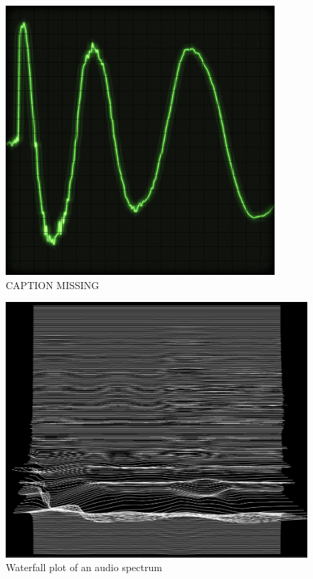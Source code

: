 \begin{figure}[H]
	\centering
	\includegraphics[width=10cm]{img/oscilloscope.png}
	\caption[shortCaption]
	{CAPTION MISSING}
	\label{fig:label}
\end{figure}


\begin{figure}[H]
  \centering
  \includegraphics[width=\textwidth]{img/waterfall.PNG}
  \caption[shortCaption]
  {Waterfall plot of an audio spectrum}
  \label{fig:label}
\end{figure}



